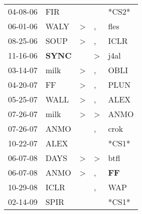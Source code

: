 \begin{supertabular}{p{0.07\textwidth}p{0.06\textwidth}p{0.02\textwidth}p{0.02\textwidth}p{0.06\textwidth}}
          04-08-06\textsuperscript{} &            FIR\textsuperscript{} &                  &                  &                            *CS2* \\
          06-01-06\textsuperscript{} &           WALY\textsuperscript{} &     \textgreater &                , &           fles\textsuperscript{} \\
          08-25-06\textsuperscript{} &           SOUP\textsuperscript{} &     \textgreater &                , &           ICLR\textsuperscript{} \\
          11-16-06\textsuperscript{} &  \textbf{SYNC\textsuperscript{}} &                  &     \textgreater &           j4al\textsuperscript{} \\
          03-14-07\textsuperscript{} &           milk\textsuperscript{} &     \textgreater &                , &           OBLI\textsuperscript{} \\
          04-20-07\textsuperscript{} &             FF\textsuperscript{} &     \textgreater &                , &           PLUN\textsuperscript{} \\
          05-25-07\textsuperscript{} &           WALL\textsuperscript{} &     \textgreater &                , &           ALEX\textsuperscript{} \\
          07-26-07\textsuperscript{} &           milk\textsuperscript{} &     \textgreater &     \textgreater &           ANMO\textsuperscript{} \\
          07-26-07\textsuperscript{} &           ANMO\textsuperscript{} &                  &                , &           crok\textsuperscript{} \\
          10-22-07\textsuperscript{} &           ALEX\textsuperscript{} &                  &                  &                            *CS1* \\
          06-07-08\textsuperscript{} &           DAYS\textsuperscript{} &     \textgreater &     \textgreater &           btfl\textsuperscript{} \\
          06-07-08\textsuperscript{} &           ANMO\textsuperscript{} &     \textgreater &                , &    \textbf{FF\textsuperscript{}} \\
          10-29-08\textsuperscript{} &           ICLR\textsuperscript{} &                  &                , &            WAP\textsuperscript{} \\
          02-14-09\textsuperscript{} &           SPIR\textsuperscript{} &                  &                  &                            *CS1* \\

\end{supertabular}
